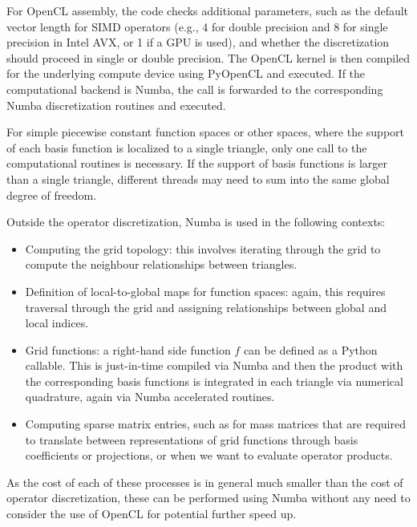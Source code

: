 For OpenCL assembly, the code checks additional parameters, such as the default vector length for SIMD operators (e.g., 4 for double precision and 8 for single precision in Intel AVX, or 1 if a GPU is used), and whether the discretization should proceed in single or double precision. The OpenCL kernel is then compiled for the underlying compute device using PyOpenCL and executed. If the computational backend is Numba, the call is forwarded to the corresponding Numba discretization routines and executed.

For simple piecewise constant function spaces or other spaces, where the support of each basis function is localized to a single triangle, only one call to the computational routines is necessary. If the support of basis functions is larger than a single triangle, different threads may need to sum into the same global degree of freedom.

Outside the operator discretization, Numba is used in the following contexts:
\begin{itemize}
  \item Computing the grid topology: this involves iterating through the grid to compute the neighbour relationships between triangles.
  \item Definition of local-to-global maps for function spaces: again, this requires traversal through the grid and assigning relationships between global and local indices.
  \item Grid functions: a right-hand side function $f$ can be defined as a Python callable. This is just-in-time compiled via Numba and then the product with the corresponding basis functions is integrated in each triangle via numerical quadrature, again via Numba accelerated routines.
  \item Computing sparse matrix entries, such as for mass matrices that are required to translate between representations of grid functions through basis coefficients or projections, or when we want to evaluate operator products.
\end{itemize}

As the cost of each of these processes is in general much smaller than the cost of operator discretization, these can be performed using Numba without any need to consider the use of OpenCL for potential further speed up.

